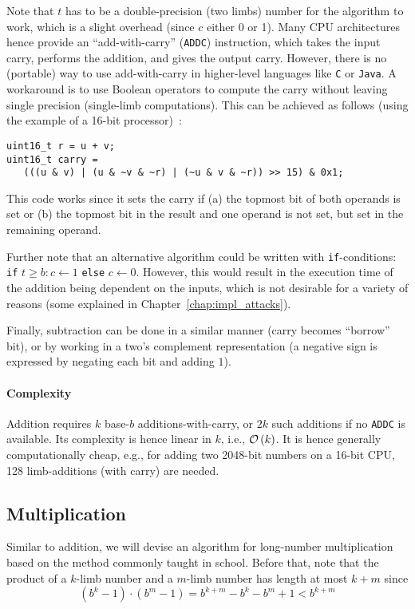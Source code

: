 Note that $t$ has to be a double-precision (two limbs) number for the algorithm to work, which is a slight overhead (since $c$ either 0 or 1). Many \ac{CPU} architectures hence provide an ``add-with-carry'' (\verb+ADDC+) instruction, which takes the input carry, performs the addition, and gives the output carry. However, there is no (portable) way to use add-with-carry in higher-level languages like \verb+C+ or \verb+Java+. 
A workaround is to use Boolean operators to compute the carry without leaving single precision (single-limb computations). This can be achieved as follows (using the example of a 16-bit processor)~\cite{SOInt}:

\lstset{language=C}
\begin{lstlisting}
uint16_t r = u + v;
uint16_t carry = 
   (((u & v) | (u & ~v & ~r) | (~u & v & ~r)) >> 15) & 0x1;
\end{lstlisting}

This code works since it sets the carry if (a) the topmost bit of both operands is set or (b) the topmost bit in the result and one operand is not set, but set in the remaining operand.

Further note that an alternative algorithm could be written with \verb+if+-conditions: \verb+if+ $t \geq b: c \gets 1$ \verb+else+ $c \gets 0$. However, this would result in the execution time of the addition being dependent on the inputs, which is not desirable for a variety of reasons (some explained in Chapter~\ref{chap:impl_attacks}).

Finally, subtraction can be done in a similar manner (carry becomes ``borrow'' bit), or by working in a two's complement representation (a negative sign is expressed by negating each bit and adding $1$). 

\paragraph{Complexity} Addition requires $k$ base-$b$ additions-with-carry, or $2k$ such additions if no \verb+ADDC+ is available. Its complexity is hence linear in $k$, i.e., $\mathcal{O} \left(k\right)$. It is hence generally computationally cheap, e.g., for adding two 2048-bit numbers on a 16-bit \ac{CPU}, 128 limb-additions (with carry) are needed.

\subsection{Multiplication}
\label{sec:asymmetric_crypto:mul}
Similar to addition, we will devise an algorithm for long-number multiplication based on the method commonly taught in school. Before that, note that the product of a $k$-limb number and a $m$-limb number has length at most $k + m$ since 
$$\left(b^k -1 \right) \cdot \left(b^m - 1\right) = b^{k + m} - b^k - b^m + 1 < b^{k+m}$$


